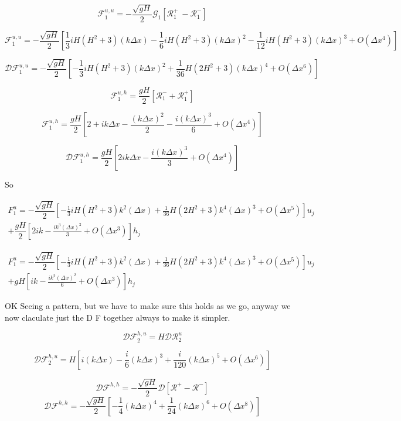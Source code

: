 \documentclass[12pt]{article}
\begin{document}
\[\mathcal{F}_1^{u,u} = - \dfrac{ \sqrt{gH}}{ 2} \mathcal{G}_1 \left [ \mathcal{R}^+_1 \ -  \mathcal{R}^-_1  \right ]\]

\[\mathcal{F}_1^{u,u} = - \dfrac{ \sqrt{gH}}{ 2}  \left [\frac{1}{3}iH(H^2 + 3)(k \Delta x) - \frac{1}{6}iH(H^2 + 3)(k \Delta x)^2 - \frac{1}{12}iH(H^2 + 3)(k \Delta x)^3  +  O( \Delta x^4)  \right ]\]

\[\mathcal{D}\mathcal{F}_1^{u,u} = - \dfrac{ \sqrt{gH}}{ 2}  \left [-\frac{1}{3}iH(H^2 + 3)(k \Delta x)^2 + \frac{1}{36}H(2H^2 + 3)(k \Delta x)^4 + O( \Delta x^6)  \right ]\]

\[\mathcal{F}_1^{u,h} = \dfrac{ gH}{ 2} [\mathcal{R}^-_1 + \mathcal{R}^+_1]\]

\[\mathcal{F}_1^{u,h} = \dfrac{ gH}{ 2} \left[2 + ik\Delta x - \frac{(k\Delta x)^2}{2} - \frac{i(k\Delta x)^3}{6} +  O( \Delta x^4) \right]\]

\[\mathcal{D}\mathcal{F}_1^{u,h} = \dfrac{ gH}{ 2} \left[2ik\Delta x -\frac{i(k\Delta x)^3}{3} +  O( \Delta x^4) \right]\]

So

\begin{multline}
F^u_1 =- \dfrac{ \sqrt{gH}}{ 2}  \left [-\frac{1}{3}iH(H^2 + 3) k^2( \Delta x) + \frac{1}{36}H(2H^2 + 3)k^4( \Delta x)^3 + O( \Delta x^5)  \right ]u_j\\ + \dfrac{ gH}{ 2} \left[2ik -\frac{i k^3(\Delta x)^2}{3} +  O( \Delta x^3) \right]h_j
\end{multline}

\begin{multline}
F^u_1 =- \dfrac{ \sqrt{gH}}{ 2}  \left [-\frac{1}{3}iH(H^2 + 3) k^2( \Delta x) + \frac{1}{36}H(2H^2 + 3)k^4(\Delta x)^3 + O( \Delta x^5)  \right ]u_j\\ + gH \left[ik -\frac{i k^3(\Delta x)^2}{6} +  O( \Delta x^3) \right]h_j
\end{multline}

OK Seeing a pattern, but we have to make sure this holds as we go, anyway we now claculate just the D F together always to make it simpler. 

\[\mathcal{D}\mathcal{F}_2^{h,u} = H\mathcal{D}\mathcal{R}_2^u\]

\[\mathcal{D}\mathcal{F}_2^{h,u} = H\left[i(k \Delta x) - \frac{i}{6}(k \Delta x)^3 + \frac{i}{120} (k \Delta x)^5 + O(\Delta x ^6) \right]\]

\[\mathcal{D}\mathcal{F}^{h,h} = -\dfrac{ \sqrt{gH}}{ 2}  \mathcal{D}\left [ \mathcal{R}^+- \mathcal{R}^- \right ]\]
\[\mathcal{D}\mathcal{F}^{h,h} = -\dfrac{ \sqrt{gH}}{ 2}  \left [ -\frac{1}{4} (k\Delta x)^4  + \frac{1}{24} (k\Delta x)^6 + O(\Delta x^8) \right ]\]
\end{document}
